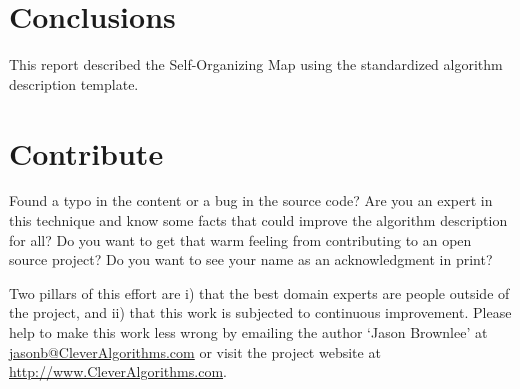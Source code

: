 \documentclass[a4paper, 11pt]{article}
\makeatletter
\newcommand{\myreportauthor}{Jason Brownlee}
\newcommand{\myreportemail}{jasonb@CleverAlgorithms.com}
\newcommand{\myreportwebsite}{http://www.CleverAlgorithms.com}
\makeatother
\begin{document}
% 
% 
\section{Conclusions}
\label{sec:conclusions}
This report described the Self-Organizing Map using the standardized algorithm description template.

% 
% 
\section{Contribute}
\label{sec:contribute}
Found a typo in the content or a bug in the source code? 
Are you an expert in this technique and know some facts that could improve the algorithm description for all?
Do you want to get that warm feeling from contributing to an open source project? 
Do you want to see your name as an acknowledgment in print?

Two pillars of this effort are i) that the best domain experts are people outside of the project, and ii) that this work is subjected to continuous improvement. 
Please help to make this work less wrong by emailing the author `\myreportauthor' at \url{\myreportemail} or visit the project website at \url{\myreportwebsite}.



\end{document}
